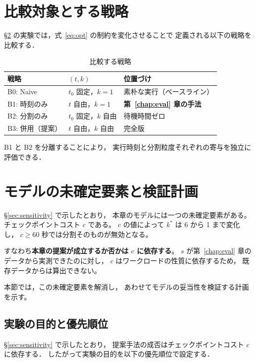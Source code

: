 \documentclass[11pt,a4paper]{ltjsreport}
\begin{document}
\section{比較対象とする戦略}

\S\ref{sec:plan} の実験では，式~\eqref{eq:opt} の制約を変化させることで
定義される以下の戦略を比較する．

\begin{table}[htbp]
\centering
\caption{比較する戦略}
\label{tab:strategies}
\small
\begin{tabularx}{\textwidth}{@{}llX@{}}
\toprule
戦略 & $(t, k)$ & 位置づけ \\
\midrule
B0: Naive        & $t_0$ 固定，$k{=}1$ & 素朴な実行（ベースライン） \\
B1: 時刻のみ     & $t$ 自由，$k{=}1$   & \textbf{第~\ref{chap:eval} 章の手法} \\
B2: 分割のみ     & $t_0$ 固定，$k$ 自由 & 待機時間ゼロ \\
B3: 併用（提案） & $t$ 自由，$k$ 自由   & 完全版 \\
\bottomrule
\end{tabularx}
\end{table}

B1 と B2 を分離することにより，
実行時刻と分割粒度それぞれの寄与を独立に評価できる．

\section{モデルの未確定要素と検証計画}
\label{sec:plan}

\S\ref{sec:sensitivity} で示したとおり，
本章のモデルには一つの未確定要素がある。
チェックポイントコスト $c$ である。
$c$ の値によって $k^{*}$ は 6 から 1 まで変化し，
$c \geq 60$ 秒では分割そのものが無効となる。

すなわち\textbf{本章の提案が成立するか否かは $c$ に依存する}。
$s$ が第~\ref{chap:eval} 章のデータから実測できたのに対し，
$c$ はワークロードの性質に依存するため，
既存データからは算出できない。

本節では，この未確定要素を解消し，
あわせてモデルの妥当性を検証する計画を示す。

\subsection{実験の目的と優先順位}

\S\ref{sec:sensitivity} で示したとおり，
提案手法の成否はチェックポイントコスト $c$ に依存する．
したがって実験の目的を以下の優先順位で設定する．
\end{document}
